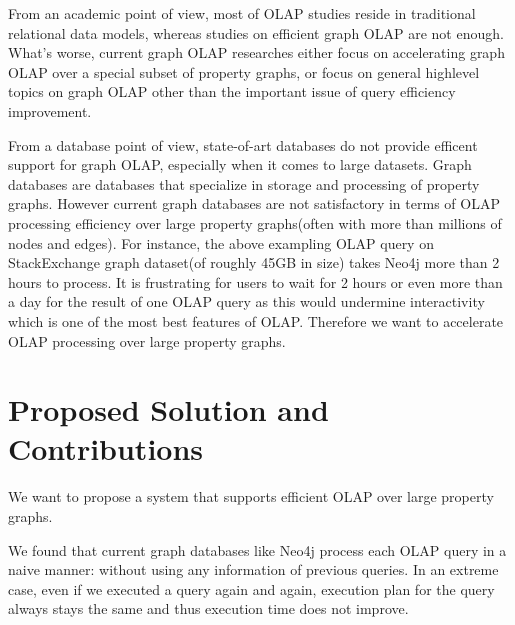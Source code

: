 From an academic point of view, most of OLAP studies reside in traditional relational data models, whereas studies on efficient graph OLAP are not enough. What's worse, current graph OLAP researches either focus on accelerating graph OLAP over a special subset of property graphs, or focus on general highlevel topics on graph OLAP other than the important issue of query efficiency improvement. 

From a database point of view, state-of-art databases do not provide efficent support for graph OLAP, especially when it comes to large datasets. Graph databases are databases that specialize in storage and processing of property graphs. However current graph databases are not satisfactory in terms of OLAP processing efficiency over large property graphs(often with more than millions of nodes and edges). For instance, the above exampling OLAP query on StackExchange graph dataset(of roughly 45GB in size) takes Neo4j more than 2 hours to process. It is frustrating for users to wait for 2 hours or even more than a day for the result of one OLAP query as this would undermine interactivity which is one of the most best features of OLAP. Therefore we want to accelerate OLAP processing over large property graphs.

	
	


\section{Proposed Solution and Contributions}
We want to propose a system that supports efficient  OLAP over large property graphs.

	We found that current graph databases like Neo4j process each OLAP query in a naive manner: without using any information of previous queries. In an extreme case, even if we executed a query again and again, execution plan for the query always stays the same and thus execution time does not improve. 

